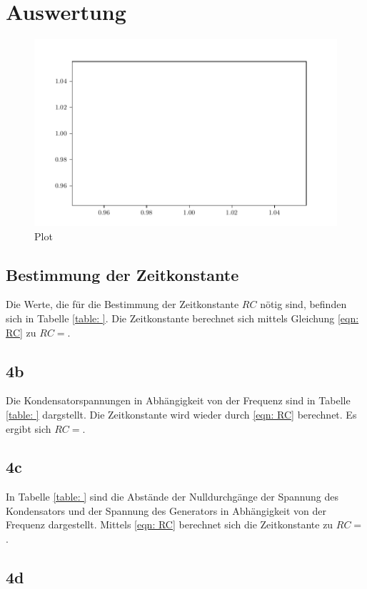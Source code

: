 \section{Auswertung}
\label{sec:Auswertung}

\begin{figure}
  \centering
  \includegraphics{plot.pdf}
  \caption{Plot}
  \label{fig:plot}
\end{figure}

\subsection{Bestimmung der Zeitkonstante}
Die Werte, die für die Bestimmung der Zeitkonstante $RC$ nötig sind, befinden sich in Tabelle \ref{table: }. %
Die Zeitkonstante berechnet sich mittels Gleichung \eqref{eqn: RC} zu $RC = $. %

\subsection{4b}
Die Kondensatorspannungen in Abhängigkeit von der Frequenz sind in Tabelle \ref{table: } dargstellt. %
Die Zeitkonstante wird wieder durch \eqref{eqn: RC} berechnet. Es ergibt sich $RC = $. %

\subsection{4c}
In Tabelle \ref{table: } sind die Abstände der Nulldurchgänge der Spannung des Kondensators und der Spannung %
des Generators in Abhängigkeit von der Frequenz dargestellt.
Mittels \eqref{eqn: RC} berechnet sich die Zeitkonstante zu $RC = $. %

\subsection{4d}

